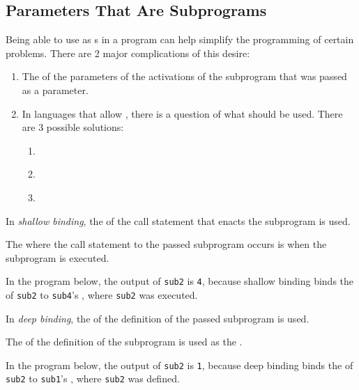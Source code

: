 \subsection{Parameters That Are Subprograms}\label{subsec:Parameters_are_Subprograms}
Being able to use  as s in a program can help simplify the programming of certain problems.
There are 2 major complications of this desire:
\begin{enumerate}[noitemsep]
\item The  of the parameters of the activations of the subprogram that was passed as a parameter.
\item In languages that allow , there is a question of what  should be used. There are 3 possible solutions:
  \begin{enumerate}[noitemsep]
  \item \emph{}
  \item \emph{}
  \item \emph{}
  \end{enumerate}
\end{enumerate}

\begin{definition}\label{def:Shallow_Binding}
  In \emph{shallow binding}, the  of the call statement that enacts the subprogram is used.

  The  where the call statement to the passed subprogram occurs is  when the subprogram is executed.

  \begin{remark}\label{rmk:Shallow_Binding-Program_Output}
    In the program below, the output of \texttt{sub2} is \texttt{4}, because shallow binding binds the  of \texttt{sub2} to \texttt{sub4}'s , where \texttt{sub2} was executed.
  \end{remark}
\end{definition}

\begin{definition}\label{def:Deep_Binding}
  In \emph{deep binding}, the  of the definition of the passed subprogram is used.

  The  of the definition of the subprogram is used as the .

  \begin{remark}\label{rmk:Deep_Binding-Program_Output}
    In the program below, the output of \texttt{sub2} is \texttt{1}, because deep binding binds the  of \texttt{sub2} to \texttt{sub1}'s , where \texttt{sub2} was defined.
  \end{remark}
\end{definition}

